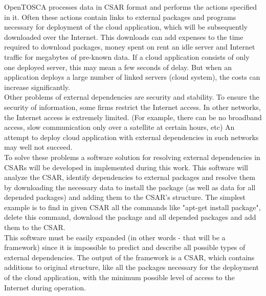OpenTOSCA processes data in CSAR format and performs the actions specified in it.%
Often these actions contain links to external packages and programs necessary for deployment of the cloud application, which will be subsequently downloaded over the Internet.
This downloads can add expenses to the time required to download packages, money spent on rent an idle server and Internet traffic for megabytes of pre-known data.
If a cloud application consists of only one deployed server, this may mean a few seconds of delay. 
But when an application deploys a large number of linked servers (cloud system), the costs can increase significantly.\\
Other problems of external dependencies are security and stability.
To ensure the security of information, some firms restrict the Internet access.
In other networks, the Internet access is extremely limited.
(For example, there can be no broadband access, slow communication only over a satellite at certain hours, etc)
An attempt to deploy cloud application with external dependencies in such networks may well not succeed. \\
To solve these problems a software solution for resolving external dependencies in CSARs will be developed in implemented during this work.
This software will analyze the CSAR, identify dependencies to external packages and resolve them by downloading the necessary data to install the package (as well as data for all depended packages) and adding them to the CSAR's structure.
The simplest example is to find in given CSAR all the commands like "apt-get install package", delete this command, download the package and all depended packages and add them to the CSAR.\\
This software must be easily expanded (in other words - that will be a framework) since it is impossible to predict and describe all possible types of external dependencies.
The output of the framework is a CSAR, which contains additions to original structure, like all the packages necessary for the deployment of the cloud application, with the minimum possible level of access to the Internet during operation.
\clearpage 
